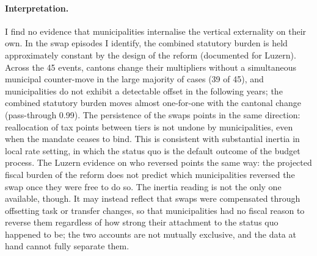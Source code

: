 \documentclass[11pt,a4paper]{article}
\begin{document}
\paragraph{Interpretation.} I find no evidence that municipalities internalise the vertical externality on their own. In the swap episodes I identify, the combined statutory burden is held approximately constant by the design of the reform (documented for Luzern). Across the 45 events, cantons change their multipliers without a simultaneous municipal counter-move in the large majority of cases (39 of 45), and municipalities do not exhibit a detectable offset in the following years; the combined statutory burden moves almost one-for-one with the cantonal change (pass-through 0.99). The persistence of the swaps points in the same direction: reallocation of tax points between tiers is not undone by municipalities, even when the mandate ceases to bind. This is consistent with substantial inertia in local rate setting, in which the status quo is the default outcome of the budget process. The Luzern evidence on who reversed points the same way: the projected fiscal burden of the reform does not predict which municipalities reversed the swap once they were free to do so. The inertia reading is not the only one available, though. It may instead reflect that swaps were compensated through offsetting task or transfer changes, so that municipalities had no fiscal reason to reverse them regardless of how strong their attachment to the status quo happened to be; the two accounts are not mutually exclusive, and the data at hand cannot fully separate them.
\end{document}
